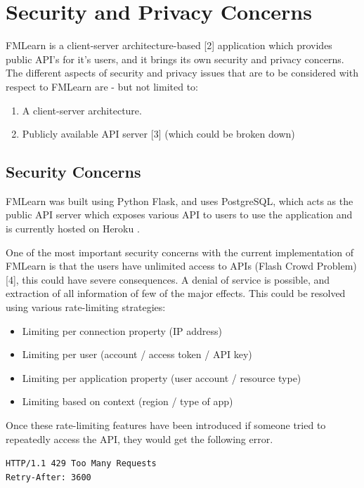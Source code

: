 \section{Security and Privacy Concerns}
FMLearn is a client-server architecture-based [2] application which provides public API’s for it's users, and it brings its own security and privacy concerns. The different aspects of security and privacy issues that are to be considered with respect to FMLearn are - but not limited to:

\begin{enumerate}
    \item A client-server architecture.
    \item Publicly available API server [3] (which could be broken down)
\end{enumerate}

\subsection{Security Concerns}

FMLearn was built using Python Flask, and uses PostgreSQL, which acts as the public API server which exposes various API to users to use the application and is currently hosted on Heroku .

One of the most important security concerns with the current implementation of FMLearn is that the users have unlimited access to APIs (Flash Crowd Problem) [4], this could have severe consequences. A denial of service is possible, and extraction of all information of few of the major effects. This could be resolved using various rate-limiting strategies:

\begin{itemize} 
    \item Limiting per connection property (IP address)
    \item Limiting per user (account / access token / API key)
    \item Limiting per application property (user account / resource type)
    \item Limiting based on context (region / type of app)
\end{itemize}

Once these rate-limiting features have been introduced if someone tried to repeatedly access the API, they would get the following error.

\begin{center}
\texttt{HTTP/1.1 429 Too Many Requests}\\
\texttt{Retry-After: 3600}
\end{center}


